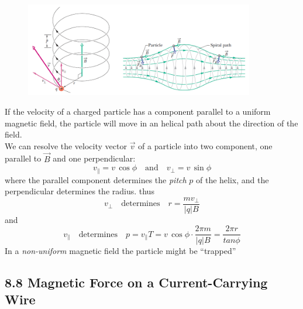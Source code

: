 \documentclass[12pt, a4paper]{article}
\begin{document}
		\begin{figure}[!b]
			\centering
			\includegraphics[width=10cm]{Physics2_PNGs/helical-path.png}
			\caption*{}
			\label{fig:helical-path.png}
		\end{figure}
		If the velocity of a charged particle has a component parallel to a uniform magnetic field, the particle will move in an helical path about the direction of the field. \\
		We can resolve the velocity vector $\vec{v}$ of a particle into two component, one parallel to $\vec{B}$ and one perpendicular:
		\[
			v_{\parallel} = v \, \cos \phi \quad \text{and} \quad
			v_{\perp} = v \, \sin \phi
			\tag{8-12}
		\]
		where the parallel component determines the \textit{pitch} $p$ of the helix, and the perpendicular determines the radius.
		thus
		\[
			v_{\perp} \quad \text{determines} \quad r = \frac{mv_{\perp}}{|q| B}
		\]
		and 
		\[
			v_{\parallel} \quad \text{determines} \quad 
			p = v_{\parallel} T = v \, \cos \phi \cdot \frac{2 \pi m}{|q| B}
			   = \frac{2 \pi r}{tan \phi}
		\]
		In a \textit{non-uniform} magnetic field the particle might be ``trapped''
		
		
		
		\subsection*{8.8 Magnetic Force on a Current-Carrying Wire}
		
		
	
	

	
\end{document}
